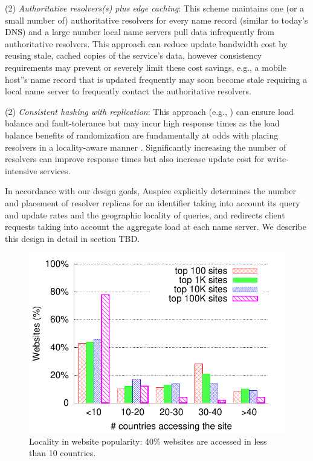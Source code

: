 (2) {\em Authoritative resolvers(s) plus edge caching}: This scheme maintains one (or a small number of) authoritative resolvers for every name record (similar to today's DNS) and a large number local name servers pull data infrequently from authoritative resolvers. This approach can reduce update bandwidth cost by reusing stale, cached copies of the service's data, however consistency requirements may prevent or severely limit these cost savings, e.g., a mobile host''s name record that is updated frequently may soon become stale requiring a local name server to frequently contact the authoritative resolvers.


(2) {\em Consistent hashing with replication}: This approach (e.g., \cite{consistent-hashing}) can ensure load balance and fault-tolerance but may incur high response times as the load balance benefits of randomization are fundamentally at odds with placing resolvers in a locality-aware manner \cite{codons,cox, beehive}. Significantly increasing the number of resolvers  can improve response times but also increase update cost for write-intensive services.

In accordance with our design goals, Auspice explicitly determines the number and placement of resolver replicas for an identifier taking into account its query and update rates and the geographic locality of queries, and redirects client requests taking into account the aggregate load at each name server. We describe this design in detail in section TBD.


\begin{figure}[t]
\centering
\includegraphics[scale=0.6]{figure/numcountry_boxplot.pdf}
\vspace{-0.1in}
\caption{Locality in website popularity: 40\% websites are accessed in less than 10 countries.}
\label{fig:localityweb}
\end{figure}


